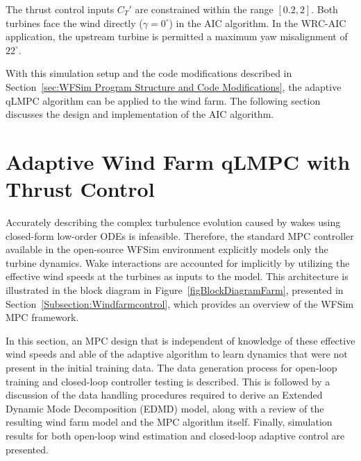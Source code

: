 The thrust control inputs $C_T'$ are constrained within the range $[0.2, 2]$.  Both turbines face the wind directly ($\gamma = 0^{\circ}$) in the AIC algorithm. In the WRC-AIC application, the upstream turbine is permitted a maximum yaw misalignment of $22^{\circ}$.

With this simulation setup and the code modifications described in Section~\ref{sec:WFSim Program Structure and Code Modifications}, the adaptive qLMPC algorithm can be applied to the wind farm. The following section discusses the design and implementation of the AIC algorithm.

\section{Adaptive Wind Farm qLMPC with Thrust Control} \label{sec:AdaptiveWindFarmqLMPCforAIC}
Accurately describing the complex turbulence evolution caused by wakes using closed-form low-order ODEs is infeasible. Therefore, the standard MPC controller available in the open-source WFSim environment explicitly models only the turbine dynamics. Wake interactions are accounted for implicitly by utilizing the effective wind speeds at the turbines as inputs to the model. This architecture is illustrated in the block diagram in Figure~\ref{figBlockDiagramFarm}, presented in Section~\ref{Subsection:Windfarmcontrol}, which provides an overview of the WFSim MPC framework.

In this section, an MPC design that is independent of knowledge of these effective wind speeds and able  of the adaptive algorithm to learn dynamics that were not present in the initial training data. The data generation process for open-loop training and closed-loop controller testing is described. This is followed by a discussion of the data handling procedures required to derive an Extended Dynamic Mode Decomposition (EDMD) model, along with a review of the resulting wind farm model and the MPC algorithm itself. Finally, simulation results for both open-loop wind estimation and closed-loop adaptive control are presented. 

